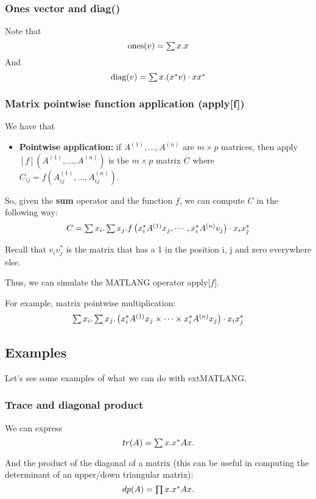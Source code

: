 \subsubsection{Ones vector and diag()}

Note that $$\text{ones}(v)=\textstyle\sum x. x$$ And $$\text{diag}(v)=\textstyle\sum x. (x^*v)\cdot xx^*$$

\subsubsection{Matrix pointwise function application (apply[f])}

We have that 

\begin{itemize}
	\item \textbf{Pointwise application:} if $A^{(1)}, \ldots, A^{(n)}$ are $m\times p$ matrices, then apply$\left[ f \right](A^{(1)}, \ldots, A^{(n)})$ is the $m\times p$ matrix $C$ where $C_{ij}=f(A^{(1)}_{ij}, \ldots, A^{(n)}_{ij})$.
\end{itemize}

So, given the \textbf{sum} operator and the function $f$, we can compute $C$ in the following way: $$C=\textstyle\sum x_i.\textstyle\sum x_j. f\left( x_i^*A^{(1)}x_j, \cdots, x_i^*A^{(n)}v_j\right)\cdot x_ix_j^*$$

Recall that $v_iv_j^*$ is the matrix that has a 1 in the position i, j and zero everywhere else.

Thus, we can simulate the MATLANG operator apply[$f$].

For example, matrix pointwise multiplication: $$\textstyle\sum x_i.\textstyle\sum x_j.\left( x_i^*A^{(1)}x_j\times \cdots\times x_i^*A^{(n)}x_j\right)\cdot x_ix_j^*$$

\subsection{Examples}

Let's see some examples of what we can do with extMATLANG.

\subsubsection{Trace and diagonal product}

We can express $$tr(A)=\textstyle\sum x. x^*Ax.$$

And the product of the diagonal of a matrix (this can be useful in computing the determinant of an upper/down triangular matrix): $$dp(A)=\textstyle\prod x. x^*Ax.$$

